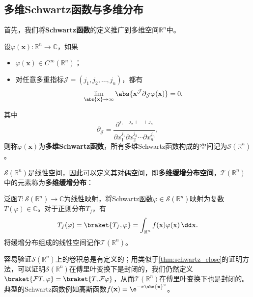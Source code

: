 \subsection{多维Schwartz函数与多维分布}\label{sub:multi_schwartz}

首先，我们将\textbf{Schwartz函数}的定义推广到多维空间$\mathbb{R}^n$中。
\begin{definition}[多维Schwartz函数]
    设$\varphi(\mathbf{x}):\mathbb{R}^n\to\mathbb{C}$，如果
    \begin{itemize}
        \item $\varphi(\mathbf{x})\in C^{\infty}(\mathbb{R}^n)$；
        \item 对任意多重指标$\mathcal{J}=(j_1,j_2,\ldots,j_n)$，都有
        \begin{equation}
            \lim_{\abs{\mathbf{x}}\to\infty}\abs{\mathbf{x}^{\mathcal{J}}\partial_{\mathcal{J}}\varphi(\mathbf{x})}=0,
        \end{equation}
    \end{itemize}
    其中
    \begin{equation}
        \partial_{\mathcal{J}}=\frac{\partial^{j_1+j_2+\cdots+j_n}}{\partial x_1^{j_1}\partial x_2^{j_2}\cdots\partial x_n^{j_n}},
    \end{equation}
    则称$\varphi(\mathbf{x})$为\textbf{多维Schwartz函数}，所有多维Schwartz函数构成的空间记为$\mathcal{S}(\mathbb{R}^n)$。
\end{definition}

$\mathcal{S}(\mathbb{R}^n)$是线性空间，因此可以定义其对偶空间，即\textbf{多维缓增分布空间}，$\mathcal{T}(\mathbb{R}^n)$中的元素称为\textbf{多维缓增分布}：
\begin{definition}[多维缓增分布]
    泛函$T:\mathcal{S}(\mathbb{R}^n)\to\mathbb{C}$为线性映射，将Schwartz函数$\varphi\in\mathcal{S}(\mathbb{R}^n)$映射为复数$T(\varphi)\in\mathbb{C}$。对于正则分布$T_f$，有
    \begin{equation}
        T_f(\varphi)=\braket{T_f,\varphi}=\int_{\mathbb{R}^n}f(\mathbf{x})\varphi(\mathbf{x})\,\dd\mathbf{x}.
    \end{equation}
    将缓增分布组成的线性空间记作$\mathcal{T}(\mathbb{R}^n)$。
\end{definition}

容易验证$\mathcal{S}(\mathbb{R}^n)$上的卷积总是有定义的；用类似于\cref{thm:schwartz_close}的证明方法，可以证明$\mathcal{S}(\mathbb{R}^n)$在傅里叶变换下是封闭的，我们仍然定义$\braket{\mathcal{F}T,\varphi}=\braket{T,\mathcal{F}\varphi}$，从而$\mathcal{T}(\mathbb{R}^n)$在傅里叶变换下也是封闭的。典型的Schwartz函数例如高斯函数$f(\mathbf{x})=\e^{-\pi\abs{\mathbf{x}}^2}$。

